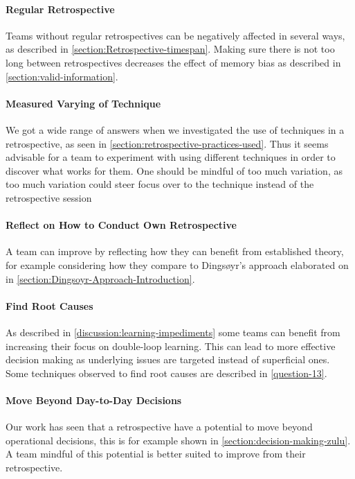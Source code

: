 \paragraph{Regular Retrospective}
Teams without regular retrospectives can be negatively affected in several ways, as described in \autoref{section:Retrospective-timespan}. Making sure there is not too long between retrospectives decreases the effect of memory bias as described in \autoref{section:valid-information}.

\paragraph{Measured Varying of Technique}
We got a wide range of answers when we investigated the use of techniques in a retrospective, as seen in \autoref{section:retrospective-practices-used}. Thus it seems advisable for a team to experiment with using different techniques in order to discover what works for them. One should be mindful of too much variation, as too much variation could steer focus over to the technique instead of the retrospective session

\paragraph{Reflect on How to Conduct Own Retrospective} %
A team can improve by reflecting how they can benefit from established theory, for example considering how they compare to Dingsøyr's approach elaborated on in \autoref{section:Dingsoyr-Approach-Introduction}.

\paragraph{Find Root Causes}
As described in \autoref{discussion:learning-impediments} some teams can benefit from increasing their focus on double-loop learning. This can lead to more effective decision making as underlying issues are targeted instead of superficial ones. Some techniques observed to find root causes are described in \autoref{question-13}.

\paragraph{Move Beyond Day-to-Day Decisions}
Our work has seen that a retrospective have a potential to move beyond operational decisions, this is for example shown in \autoref{section:decision-making-zulu}. A team mindful of this potential is better suited to improve from their retrospective.
 
